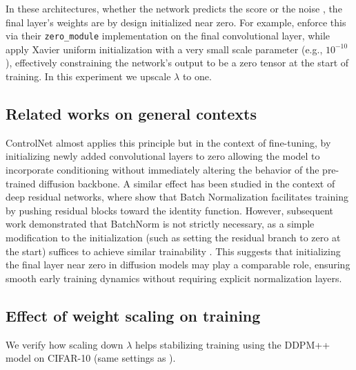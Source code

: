 \documentclass[10pt]{article} %
\begin{document}
In these architectures, whether the network predicts the score \citep{song2021scorebasedgenerativemodelingstochastic} or the noise \citep{ho2020denoisingdiffusionprobabilisticmodels, nichol2021improved}, the final layer’s weights are by design initialized near zero. For example, \citet{nichol2021improved} enforce this via their \texttt{zero\_module} implementation on the final convolutional layer, while \citet{song2021scorebasedgenerativemodelingstochastic} apply Xavier uniform initialization \citep{glorot2010understanding} with a very small scale parameter (e.g., $10^{-10}$), effectively constraining the network’s output to be a zero tensor at the start of training. In this experiment we upscale $\lambda$ to one. 

\subsection{Related works on general contexts}


ControlNet \citep{zhang2023adding} almost applies this principle but in the context of fine-tuning, by initializing newly added convolutional layers to zero allowing the model to incorporate conditioning without immediately altering the behavior of the pre-trained diffusion backbone. A similar effect has been studied in the context of deep residual networks, where \citet{de2020batch} show that Batch Normalization facilitates training by pushing residual blocks toward the identity function. However, subsequent work demonstrated that BatchNorm is not strictly necessary, as a simple modification to the initialization (such as setting the residual branch to zero at the start) suffices to achieve similar trainability \citep{zhang2019fixup}. This suggests that initializing the final layer near zero in diffusion models may play a comparable role, ensuring smooth early training dynamics without requiring explicit normalization layers.

\subsection{Effect of weight scaling on training}

We verify how scaling down $\lambda$ helps stabilizing training using the DDPM++ model on CIFAR-10 (same settings as ).
\end{document}
